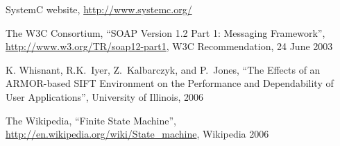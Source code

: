 SystemC website, \hyperref{http://www.systemc.org/}{}{}{http://www.systemc.org/}

The W3C Consortium, ``SOAP Version 1.2 Part 1: Messaging Framework'', \hyperref{http://www.w3.org/TR/soap12-part1}{}{}{http://www.w3.org/TR/soap12-part1}, W3C Recommendation, 24 June 2003

K. Whisnant, R.K.~Iyer, Z.~Kalbarczyk, and P.~Jones, 
``The Effects of an ARMOR-based SIFT Environment on the Performance and Dependability of User Applications'',   University of Illinois, 2006



The Wikipedia, ``Finite State Machine'', \hyperref{http://en.wikipedia.org/wiki/State\_machine}{}{}{http://en.wikipedia.org/wiki/State\_machine}, Wikipedia 2006




  





